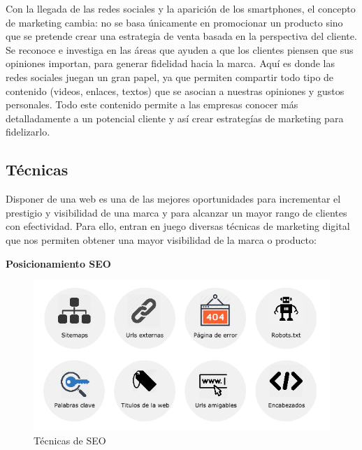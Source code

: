 \vspace{5 mm}


Con la llegada de las redes sociales y la aparición de los smartphones, el concepto de marketing cambia: no se basa únicamente en promocionar un producto sino que se pretende crear una estrategia de venta basada en la perspectiva del cliente. Se reconoce e investiga en las áreas que ayuden a que los clientes piensen que sus opiniones importan, para  generar fidelidad hacia la marca. Aquí es donde las redes sociales juegan un gran papel, ya que permiten compartir todo tipo de contenido (videos, enlaces, textos) que se asocian a nuestras opiniones y gustos personales. Todo este contenido permite a las empresas conocer más detalladamente a un potencial cliente y así crear estrategías de marketing para fidelizarlo.


\subsection{Técnicas}

Disponer de una web es una de las mejores oportunidades para incrementar el prestigio y visibilidad de una marca y para alcanzar un mayor rango de clientes con efectividad. Para ello, entran en juego diversas técnicas de marketing digital que nos permiten obtener una mayor visibilidad de la marca o producto:

\vspace{5 mm}

\textbf{Posicionamiento SEO}

\vspace{5 mm}

\begin{figure}
\begin{center}
\includegraphics[width=1.0\textwidth]{imagenes/SEO.png}
\caption{Técnicas de SEO}
\label{SEO}
\end{center}
\end{figure}

